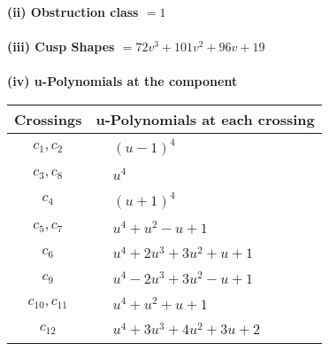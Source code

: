 \documentclass[1p]{elsarticle_modified}
\theoremstyle{definition}
\begin{document}
\flushleft \textbf{(ii) Obstruction class $= 1$}\\~\\
\flushleft \textbf{(iii) Cusp Shapes $= 72 v^3+101 v^2+96 v+19$}\\~\\
\newpage\renewcommand{\arraystretch}{1}
\flushleft \textbf{(iv) u-Polynomials at the component}\newline \\
\begin{tabular}{m{50pt}|m{274pt}}
Crossings & \hspace{64pt}u-Polynomials at each crossing \\
\hline $$\begin{aligned}c_{1},c_{2}\end{aligned}$$&$\begin{aligned}
&(u-1)^4
\end{aligned}$\\
\hline $$\begin{aligned}c_{3},c_{8}\end{aligned}$$&$\begin{aligned}
&u^4
\end{aligned}$\\
\hline $$\begin{aligned}c_{4}\end{aligned}$$&$\begin{aligned}
&(u+1)^4
\end{aligned}$\\
\hline $$\begin{aligned}c_{5},c_{7}\end{aligned}$$&$\begin{aligned}
&u^4+u^2- u+1
\end{aligned}$\\
\hline $$\begin{aligned}c_{6}\end{aligned}$$&$\begin{aligned}
&u^4+2 u^3+3 u^2+u+1
\end{aligned}$\\
\hline $$\begin{aligned}c_{9}\end{aligned}$$&$\begin{aligned}
&u^4-2 u^3+3 u^2- u+1
\end{aligned}$\\
\hline $$\begin{aligned}c_{10},c_{11}\end{aligned}$$&$\begin{aligned}
&u^4+u^2+u+1
\end{aligned}$\\
\hline $$\begin{aligned}c_{12}\end{aligned}$$&$\begin{aligned}
&u^4+3 u^3+4 u^2+3 u+2
\end{aligned}$\\
\hline
\end{tabular}\\~\\
\end{document}
